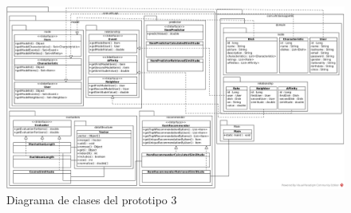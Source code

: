   \begin{landscape}
    \begin{figure}[h!]
      \centering
      \includegraphics[width=25cm]{./images/p3_classes}
      \caption{Diagrama de clases del prototipo 3}
      \label{fig:p3_classes}
    \end{figure}
  \end{landscape}



